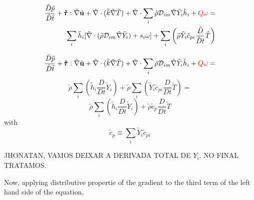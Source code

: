 \documentclass[preprint,12pt,authoryear]{elsarticle}
\begin{document}
\begin{equation}
\begin{split}
        \frac{\tilde{D} \tilde{p}}{\tilde{D}\tilde{t}}
        +       
        \pmb{\tilde{\tau}}:\tilde{\nabla} \tilde{\mathbf{u}} 
        + 
        \tilde{\nabla} \cdot (\tilde{k}\tilde{\nabla} \tilde{T})
        +
        \tilde{\nabla} \cdot
        \sum\limits_i 
        \tilde{\rho}\mathcal{D}_{im}\tilde{\nabla}\tilde{Y}_i     
        \tilde{h}_i
        +
        {\color{red} Q\omega}
        =
	\\
        \sum\limits_i
                \tilde{h}_i
                [
                	\tilde{\nabla}\cdot
			(
			\tilde{\rho}\mathcal{D}_{im}\tilde{\nabla}\tilde{Y}_i
			)
			+
        	s_i \omega
		]
        +
        \sum\limits_i
        \left(
                \tilde{\rho}
                \tilde{Y}_i
                \tilde{c}_{pi}
                \frac{\tilde{D}}{\tilde{D} t}
                \tilde{T}
        \right)
\end{split}
\end{equation}

{\color{red}
\[
        \frac{\tilde{D} \tilde{p}}{\tilde{D}\tilde{t}}
        +       
        \pmb{\tilde{\tau}}:\tilde{\nabla} \tilde{\mathbf{u}} 
        + 
        \tilde{\nabla} \cdot (\tilde{k}\tilde{\nabla} \tilde{T})
        +
        \tilde{\nabla} \cdot
        \sum\limits_i 
        \tilde{\rho}\mathcal{D}_{im}\tilde{\nabla}\tilde{Y}_i     
        \tilde{h}_i
        +
        {\color{red} Q\omega}
        =
\]
\[
         \tilde{\rho}
        \sum\limits_i
        \left(
                \tilde{h}_i
                \frac{D}{Dt}
		\tilde{Y}_i
		\right)
                +
        \tilde{\rho}
        \sum\limits_i
        \left(
                \tilde{Y}_i
                \tilde{c}_{pi}
                \frac{D}{Dt}
		\tilde{T}
        \right)
        =
\]
\[
         \tilde{\rho}
         \sum\limits_i
        \left(
                \tilde{h}_i
                \frac{D}{Dt}
		\tilde{Y}_i
		\right)
                +
                 \tilde{\rho} \tilde{c}_{p}
                \frac{D}{Dt}
		\tilde{T}
\]
with
\[
     \tilde{c}_p \equiv \sum\limits_i \tilde{Y}_i \tilde{c}_{pi}
\]

JHONATAN, VAMOS DEIXAR A DERIVADA TOTAL DE $Y_i$. NO FINAL TRATAMOS.
}

Now, applying distributive propertie of the gradient to the third term  of the left hand side of the equation, 
\end{document}
